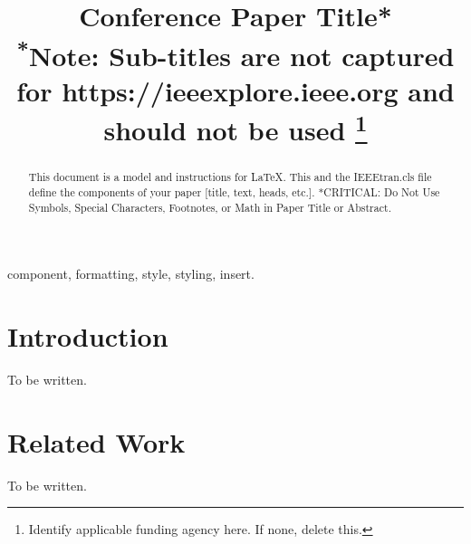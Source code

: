 \documentclass[conference]{IEEEtran}
\begin{document}
\title{Conference Paper Title*\\
{\footnotesize \textsuperscript{*}Note: Sub-titles are not captured for https://ieeexplore.ieee.org  and
should not be used}
\thanks{Identify applicable funding agency here. If none, delete this.}
}

\author{
\and
{}
\and
{}
}

\maketitle

\begin{abstract}
This document is a model and instructions for \LaTeX.
This and the IEEEtran.cls file define the components of your paper [title, text, heads, etc.]. *CRITICAL: Do Not Use Symbols, Special Characters, Footnotes, 
or Math in Paper Title or Abstract.
\end{abstract}

\begin{IEEEkeywords}
component, formatting, style, styling, insert.
\end{IEEEkeywords}

\section{Introduction}
To be written.

\section{Related Work}
To be written.
\cite{guan2024identifyingdriftdiffusioncausal}
\end{document}
